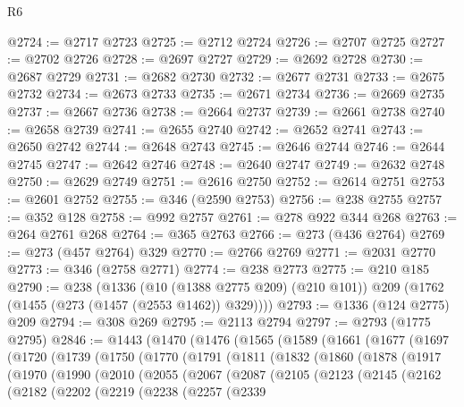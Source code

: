 \begin{lexlean}{R6}
\begin{coremodule}
{{{{{{{{{{{{{{{{{{{@2724 := @2717 @2723
@2725 := @2712 @2724
@2726 := @2707 @2725
@2727 := @2702 @2726
@2728 := @2697 @2727
@2729 := @2692 @2728
@2730 := @2687 @2729
@2731 := @2682 @2730
@2732 := @2677 @2731
@2733 := @2675 @2732
@2734 := @2673 @2733
@2735 := @2671 @2734
@2736 := @2669 @2735
@2737 := @2667 @2736
@2738 := @2664 @2737
@2739 := @2661 @2738
@2740 := @2658 @2739
@2741 := @2655 @2740
@2742 := @2652 @2741
@2743 := @2650 @2742
@2744 := @2648 @2743
@2745 := @2646 @2744
@2746 := @2644 @2745
@2747 := @2642 @2746
@2748 := @2640 @2747
@2749 := @2632 @2748
@2750 := @2629 @2749
@2751 := @2616 @2750
@2752 := @2614 @2751
@2753 := @2601 @2752
@2755 := @346 (@2590 @2753)
@2756 := @238 @2755
@2757 := @352 @128
@2758 := @992 @2757
@2761 := @278 @922 @344 @268
@2763 := @264 @2761 @268
@2764 := @365 @2763
@2766 := @273 (@436 @2764)
@2769 := @273 (@457 @2764) @329
@2770 := @2766 @2769
@2771 := @2031 @2770
@2773 := @346 (@2758 @2771)
@2774 := @238 @2773
@2775 := @210 @185
@2790 := @238
    (@1336
      (@10 (@1388 @2775 @209) (@210 @101))
      @209
      (@1762 (@1455 (@273 (@1457 (@2553 @1462)) @329))))
@2793 := @1336 (@124 @2775) @209
@2794 := @308 @269
@2795 := @2113 @2794
@2797 := @2793 (@1775 @2795)
@2846 := @1443
    (@1470
      (@1476
        (@1565
          (@1589
            (@1661
              (@1677
                (@1697
                  (@1720
                    (@1739
                      (@1750
                        (@1770
                          (@1791
                            (@1811
                              (@1832
                                (@1860
                                  (@1878
                                    (@1917
                                      (@1970
                                        (@1990
                                          (@2010
                                            (@2055
                                              (@2067
                                                (@2087
                                                  (@2105
                                                    (@2123
                                                      (@2145
                                                        (@2162
                                                          (@2182
                                                            (@2202
                                                              (@2219
                                                                (@2238
                                                                  (@2257
                                                                    (@2339
}}}}}}}}}}}}}}}}}}}
\end{coremodule}
\end{lexlean}

